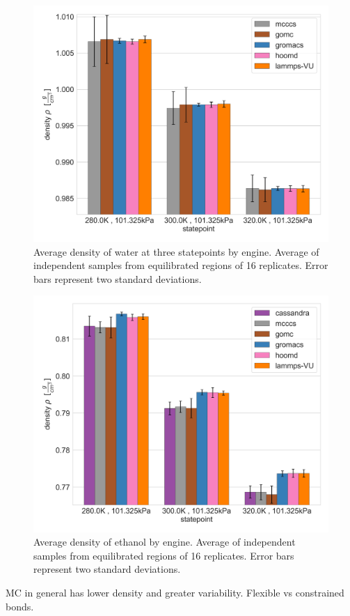 \begin{figure}[h!]
    \centering
    \includegraphics[width=0.8\linewidth,keepaspectratio]{figures/rep_study/waterSPCE_summary.png}
    \caption{Average density of water at three statepoints by engine. Average of independent samples from equilibrated regions of 16 replicates. Error bars represent two standard deviations.}\label{fig:water_density}
\end{figure}

\begin{figure}[h!]
    \centering
    \includegraphics[width=0.8\linewidth,keepaspectratio]{figures/rep_study/ethanolAA_summary.png}
    \caption{Average density of ethanol by engine. Average of independent samples from equilibrated regions of 16 replicates. Error bars represent two standard deviations.}\label{fig:ethanol_density}
\end{figure}

MC in general has lower density and greater variability. Flexible vs constrained bonds.

